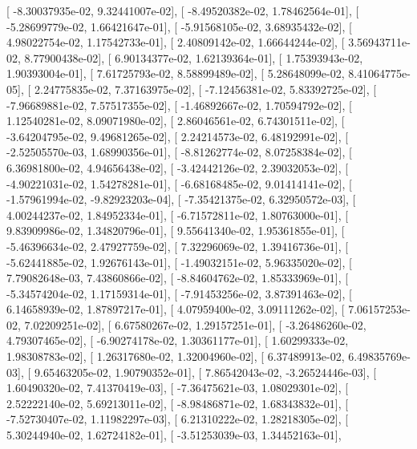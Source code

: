 \documentclass{article}
\begin{document}
       [ -8.30037935e-02,   9.32441007e-02],
       [ -8.49520382e-02,   1.78462564e-01],
       [ -5.28699779e-02,   1.66421647e-01],
       [ -5.91568105e-02,   3.68935432e-02],
       [  4.98022754e-02,   1.17542733e-01],
       [  2.40809142e-02,   1.66644244e-02],
       [  3.56943711e-02,   8.77900438e-02],
       [  6.90134377e-02,   1.62139364e-01],
       [  1.75393943e-02,   1.90393004e-01],
       [  7.61725793e-02,   8.58899489e-02],
       [  5.28648099e-02,   8.41064775e-05],
       [  2.24775835e-02,   7.37163975e-02],
       [ -7.12456381e-02,   5.83392725e-02],
       [ -7.96689881e-02,   7.57517355e-02],
       [ -1.46892667e-02,   1.70594792e-02],
       [  1.12540281e-02,   8.09071980e-02],
       [  2.86046561e-02,   6.74301511e-02],
       [ -3.64204795e-02,   9.49681265e-02],
       [  2.24214573e-02,   6.48192991e-02],
       [ -2.52505570e-03,   1.68990356e-01],
       [ -8.81262774e-02,   8.07258384e-02],
       [  6.36981800e-02,   4.94656438e-02],
       [ -3.42442126e-02,   2.39032053e-02],
       [ -4.90221031e-02,   1.54278281e-01],
       [ -6.68168485e-02,   9.01414141e-02],
       [ -1.57961994e-02,  -9.82923203e-04],
       [ -7.35421375e-02,   6.32950572e-03],
       [  4.00244237e-02,   1.84952334e-01],
       [ -6.71572811e-02,   1.80763000e-01],
       [  9.83909986e-02,   1.34820796e-01],
       [  9.55641340e-02,   1.95361855e-01],
       [ -5.46396634e-02,   2.47927759e-02],
       [  7.32296069e-02,   1.39416736e-01],
       [ -5.62441885e-02,   1.92676143e-01],
       [ -1.49032151e-02,   5.96335020e-02],
       [  7.79082648e-03,   7.43860866e-02],
       [ -8.84604762e-02,   1.85333969e-01],
       [ -5.34574204e-02,   1.17159314e-01],
       [ -7.91453256e-02,   3.87391463e-02],
       [  6.14658939e-02,   1.87897217e-01],
       [  4.07959400e-02,   3.09111262e-02],
       [  7.06157253e-02,   7.02209251e-02],
       [  6.67580267e-02,   1.29157251e-01],
       [ -3.26486260e-02,   4.79307465e-02],
       [ -6.90274178e-02,   1.30361177e-01],
       [  1.60299333e-02,   1.98308783e-02],
       [  1.26317680e-02,   1.32004960e-02],
       [  6.37489913e-02,   6.49835769e-03],
       [  9.65463205e-02,   1.90790352e-01],
       [  7.86542043e-02,  -3.26524446e-03],
       [  1.60490320e-02,   7.41370419e-03],
       [ -7.36475621e-03,   1.08029301e-02],
       [  2.52222140e-02,   5.69213011e-02],
       [ -8.98486871e-02,   1.68343832e-01],
       [ -7.52730407e-02,   1.11982297e-03],
       [  6.21310222e-02,   1.28218305e-02],
       [  5.30244940e-02,   1.62724182e-01],
       [ -3.51253039e-03,   1.34452163e-01],
\end{document}

